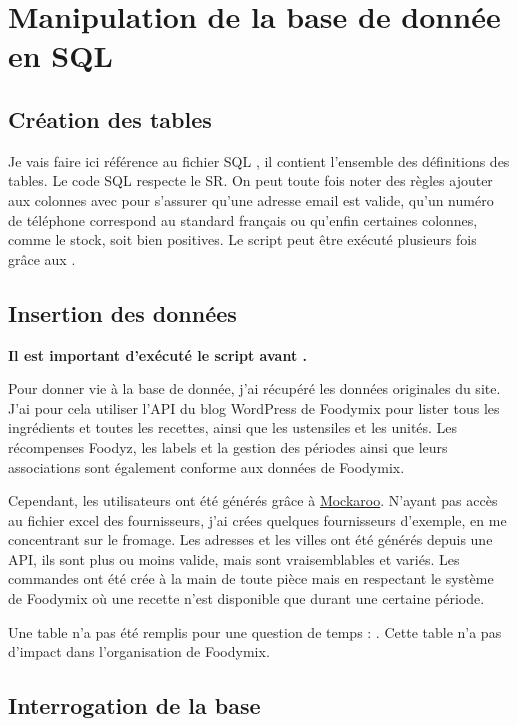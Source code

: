\documentclass{article}
\begin{document}
\section{Manipulation de la base de donnée en SQL}
\subsection{Création des tables}
Je vais faire ici référence au fichier SQL , il contient l'ensemble des définitions des tables. Le code SQL respecte le SR. On peut toute fois noter des règles ajouter aux colonnes avec  pour s'assurer qu'une adresse email est valide, qu'un numéro de téléphone correspond au standard français ou qu'enfin certaines colonnes, comme le stock, soit bien positives. Le script peut être exécuté plusieurs fois grâce aux .

\subsection{Insertion des données}
\textbf{Il est important d'exécuté le script  avant .}

Pour donner vie à la base de donnée, j'ai récupéré les données originales du site. J'ai pour cela utiliser l'API du blog WordPress de Foodymix pour lister tous les ingrédients et toutes les recettes, ainsi que les ustensiles et les unités. Les récompenses Foodyz, les labels et la gestion des périodes ainsi que leurs associations sont également conforme aux données de Foodymix.

Cependant, les utilisateurs ont été générés grâce à \href{https://www.mockaroo.com/}{Mockaroo}. N'ayant pas accès au fichier excel des fournisseurs, j'ai crées quelques fournisseurs d'exemple, en me concentrant sur le fromage. Les adresses et les villes ont été générés depuis une API, ils sont plus ou moins valide, mais sont vraisemblables et variés. Les commandes ont été crée à la main de toute pièce mais en respectant le système de Foodymix où une recette n'est disponible que durant une certaine période.

Une table n'a pas été remplis pour une question de temps : . Cette table n'a pas d'impact dans l'organisation de Foodymix.

\subsection{Interrogation de la base}
\end{document}

